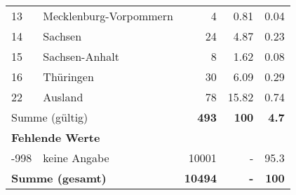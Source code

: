 \begin{longtable}{lXrrr}
     13 &
     \multicolumn{1}{X}{ Mecklenburg-Vorpommern   } &


       \num{4} &
       \num[round-mode=places,round-precision=2]{0,81} &
         \num[round-mode=places,round-precision=2]{0,04} \\

     14 &
     \multicolumn{1}{X}{ Sachsen   } &


       \num{24} &
       \num[round-mode=places,round-precision=2]{4,87} &
         \num[round-mode=places,round-precision=2]{0,23} \\

     15 &
     \multicolumn{1}{X}{ Sachsen-Anhalt   } &


       \num{8} &
       \num[round-mode=places,round-precision=2]{1,62} &
         \num[round-mode=places,round-precision=2]{0,08} \\

     16 &
     \multicolumn{1}{X}{ Thüringen   } &


       \num{30} &
       \num[round-mode=places,round-precision=2]{6,09} &
         \num[round-mode=places,round-precision=2]{0,29} \\

     22 &
     \multicolumn{1}{X}{ Ausland   } &


       \num{78} &
       \num[round-mode=places,round-precision=2]{15,82} &
         \num[round-mode=places,round-precision=2]{0,74} \\
     \midrule
     \multicolumn{2}{l}{Summe (gültig)} &
       \textbf{\num{493}} &
     \textbf{100} &
       \textbf{\num[round-mode=places,round-precision=2]{4,7}} \\
     \multicolumn{5}{l}{\textbf{Fehlende Werte}}\\
       -998 &
       keine Angabe &
         \num{10001} &
        - &
         \num[round-mode=places,round-precision=2]{95,3} \\
     \midrule
     \multicolumn{2}{l}{\textbf{Summe (gesamt)}} &
          \textbf{\num{10494}} &
        \textbf{-} &
        \textbf{100} \\
     \bottomrule
     \end{longtable}
     

